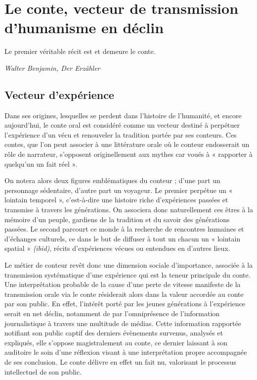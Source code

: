 \section{Le conte, vecteur de transmission d'humanisme en déclin}

\begin{shadequote}
Le premier véritable récit est et demeure le conte. \par\emph{Walter Benjamin, Der Erzähler}
\end{shadequote}


\subsection{Vecteur d'expérience}
Dans ses origines, lesquelles se perdent dans l'histoire de l'humanité, et encore aujourd'hui, le conte oral est considéré comme un vecteur destiné à perpétuer l'expérience d'un vécu et renouveler la tradition portée par ses conteurs. Ces contes, que l'on peut associer à une littérature orale où le conteur endosserait un rôle de narrateur, s'opposent originellement aux mythes car voués à « rapporter à quelqu'un un fait réel »\cite{cnrtl}.

On notera alors deux figures emblématiques du conteur ; d'une part un personnage sédentaire, d'autre part un voyageur. Le premier perpétue un « lointain temporel »\cite{nouss2003conteur}, c'est-à-dire une histoire riche d'expériences passées et transmise à travers les générations. On associera donc naturellement ces êtres à la mémoire d'un peuple, gardiens de la tradition et du savoir des générations passées. Le second parcourt ce monde à la recherche de rencontres humaines et d'échanges culturels, ce dans le but de diffuser à tout un chacun un « lointain spatial » \textit{(ibid)}, récits d'expériences vécues ou entendues en d'autres lieux.

Le métier de conteur revêt donc une dimension sociale d'importance, associée à la transmission systématique d'une expérience qui est la teneur principale du conte. Une interprétation probable de la cause d'une perte de vitesse manifeste de la transmission orale via le conte résiderait alors dans la valeur accordée au conte par son public. En effet, l'intérêt porté par les jeunes générations à l'expérience serait en net déclin, notamment de par l'omniprésence de l'information journalistique à travers une multitude de médias. Cette information rapportée notifiant son public captif des derniers évènements survenus, analysés et expliqués, elle s'oppose magistralement au conte, ce dernier laissant à son auditoire le soin d'une réflexion visant à une interprétation propre accompagnée de ses conclusion. Le conte délivre en effet un fait nu, valorisant le processus intellectuel de son public.

